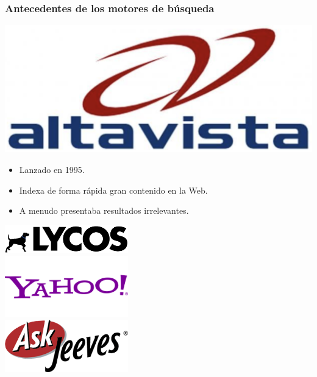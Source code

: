 \documentclass[
10pt, %
aspectratio=169, %
]{beamer}
\begin{document}
	\begin{frame}
		
		\frametitle{Antecedentes de los motores de búsqueda}
		
		\begin{minipage}[c]{0.6\textwidth}
			\includegraphics[width=\textwidth]{altavista.png}
			
			\vspace{2\baselineskip}
			
			\begin{itemize}
				\item Lanzado en 1995.
				\item Indexa de forma rápida gran contenido en la Web.
				\item A menudo presentaba resultados irrelevantes.
			\end{itemize}
			
		\end{minipage}%
		\hfill
		\begin{minipage}[c]{0.3\textwidth}
			\centering
			\includegraphics[width=0.4\textwidth]{Lycos.png}\\[1ex]
			\includegraphics[width=0.4\textwidth]{yahoo.png}\\[1ex]
			\includegraphics[width=0.4\textwidth]{ask.png}
		\end{minipage}
		
	\end{frame}
	
\end{document}

